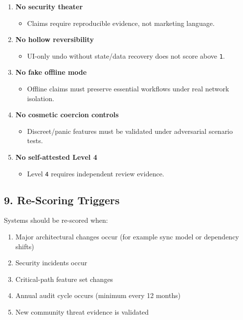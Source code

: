 \documentclass[
]{article}
\providecommand{\tightlist}{%
  \setlength{\itemsep}{0pt}\setlength{\parskip}{0pt}}
\begin{document}
\begin{enumerate}
\def\labelenumi{\arabic{enumi}.}
\tightlist
\item
  \textbf{No security theater}

  \begin{itemize}
  \tightlist
  \item
    Claims require reproducible evidence, not marketing language.
  \end{itemize}
\item
  \textbf{No hollow reversibility}

  \begin{itemize}
  \tightlist
  \item
    UI-only undo without state/data recovery does not score above
    \texttt{1}.
  \end{itemize}
\item
  \textbf{No fake offline mode}

  \begin{itemize}
  \tightlist
  \item
    Offline claims must preserve essential workflows under real network
    isolation.
  \end{itemize}
\item
  \textbf{No cosmetic coercion controls}

  \begin{itemize}
  \tightlist
  \item
    Discreet/panic features must be validated under adversarial scenario
    tests.
  \end{itemize}
\item
  \textbf{No self-attested Level 4}

  \begin{itemize}
  \tightlist
  \item
    Level \texttt{4} requires independent review evidence.
  \end{itemize}
\end{enumerate}

\subsection{9. Re-Scoring Triggers}\label{9-re-scoring-triggers}

Systems should be re-scored when:

\begin{enumerate}
\def\labelenumi{\arabic{enumi}.}
\tightlist
\item
  Major architectural changes occur (for example sync model or
  dependency shifts)
\item
  Security incidents occur
\item
  Critical-path feature set changes
\item
  Annual audit cycle occurs (minimum every 12 months)
\item
  New community threat evidence is validated
\end{enumerate}
\end{document}
